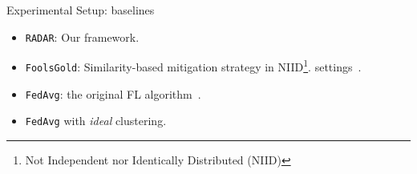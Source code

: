 \begin{frame}{Experimental Setup: baselines}
      \begin{itemize}
        \item \texttt{RADAR}: Our framework.
        \item \texttt{FoolsGold}: Similarity-based mitigation strategy in NIID\footnote{Not Independent nor Identically Distributed (NIID)}. settings~\cite{fung_LimitationsFederatedLearning_2020}.
        \item \texttt{FedAvg}: the original FL algorithm~\cite{mcmahan_Communicationefficientlearningdeep_2017}.
        \item \texttt{FedAvg} with \emph{ideal} clustering.
      \end{itemize}
\end{frame}
